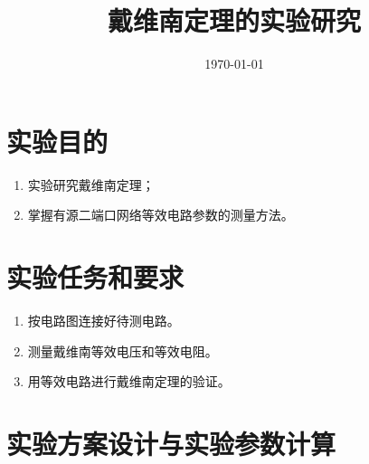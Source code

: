 \documentclass{../source/Experiment}
\title{戴维南定理的实验研究}
\date{\today}
\begin{document}
    \makecover
    \makeheader

    \section{实验目的}
        \begin{enumerate}
            \item 实验研究戴维南定理；
            \item 掌握有源二端口网络等效电路参数的测量方法。
        \end{enumerate}
    \section{实验任务和要求}
        \begin{enumerate}
            \item 按电路图连接好待测电路。
            \item 测量戴维南等效电压和等效电阻。
            \item 用等效电路进行戴维南定理的验证。
        \end{enumerate}
    \section{实验方案设计与实验参数计算}
\end{document}
